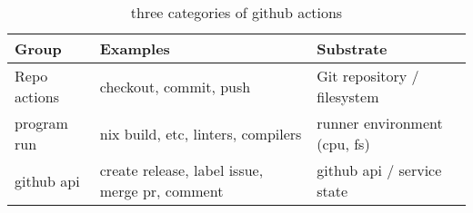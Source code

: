 \documentclass[openany, 12pt]{book}
\begin{document}
\begin{table}[h]
	\centering
	\begin{tabular}{lll}
		\toprule
		\textbf{Group} & \textbf{Examples}                              & \textbf{Substrate}           \\
		\midrule
		Repo actions   & checkout, commit, push                         & Git repository / filesystem  \\
		program run    & nix build, etc, linters, compilers             & runner environment (cpu, fs) \\
		github api     & create release, label issue, merge pr, comment & github api / service state   \\
		\bottomrule
	\end{tabular}
	\caption{three categories of github actions}
\end{table}
\end{document}
